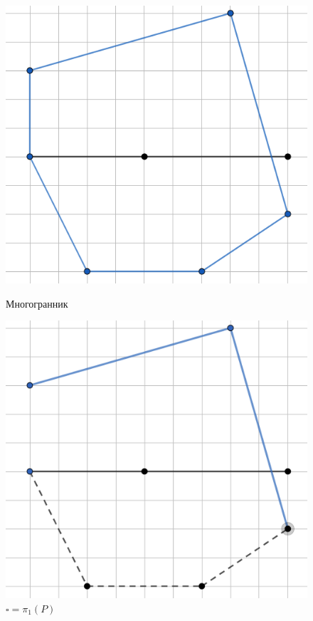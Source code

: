 \documentclass[fontsize=14pt]{scrartcl}
\theoremstyle{definition}
\begin{document}
\begin{figure}[!htb]
  \includegraphics[width=\linewidth]{poly1.png}
  \caption{Многогранник}\label{fig:awesome_image1}
\endminipage\hfill
{}
  \includegraphics[width=\linewidth]{poly2.png}
  \caption{$\square = \pi_1(P)$}\label{fig:awesome_image2}
\endminipage\hfill

\end{figure}
\end{document}
